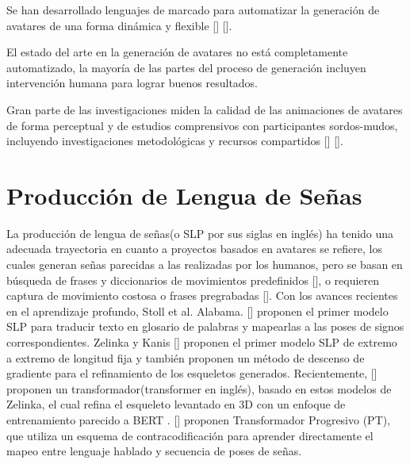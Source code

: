  Se han desarrollado lenguajes de marcado para automatizar la generación de avatares de una forma dinámica y flexible [\cite{latoschik2017effect}] [\cite{aneja2019high}].

El estado del arte en la generación de avatares no está completamente automatizado, la mayoría de las partes del proceso de generación incluyen intervención humana para lograr buenos resultados.

Gran parte de las investigaciones miden la calidad de las animaciones de avatares de forma perceptual y de estudios comprensivos con participantes sordos-mudos, incluyendo investigaciones metodológicas y recursos compartidos [\cite{huenerfauth2006generating}] [\cite{kacorri2017regression}].


\section{Producción de Lengua de Señas}\label{section:state-of-the-art:slp}
La producción de lengua de señas(o SLP por sus siglas en inglés) ha tenido una adecuada trayectoria en cuanto a proyectos basados en avatares se refiere, los cuales generan señas parecidas a las realizadas por los humanos, pero se basan en búsqueda de frases y diccionarios de movimientos predefinidos [\cite{McDonald2015AnAT}], o requieren captura de movimiento costosa o frases pregrabadas [\cite{Lu2011DataDrivenSO}]. Con los avances recientes en el aprendizaje profundo, Stoll et al. Alabama. [\cite{stoll2018sign}] proponen el primer modelo SLP para traducir texto en glosario de palabras y mapearlas a las poses de signos correspondientes. Zelinka y Kanis [\cite{Zelinka_2020_WACV}] proponen el primer modelo SLP de extremo a extremo de longitud fija y  también proponen un método de descenso de gradiente para el refinamiento de los esqueletos generados. Recientemente, [\cite{Jiang2021SkeletorST}] proponen un transformador(transformer en inglés), basado en estos modelos de Zelinka, el cual refina el esqueleto levantado en 3D con un enfoque de entrenamiento parecido a BERT . [\cite{saunders2020progressive}] proponen Transformador Progresivo (PT), que utiliza un esquema de contracodificación para aprender directamente el mapeo entre lenguaje hablado y secuencia de poses de señas.

